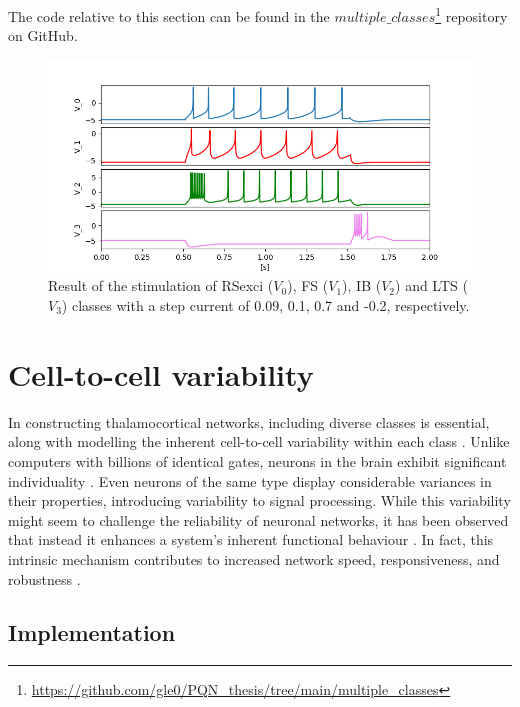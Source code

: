 The code relative to this section can be found in 
the $multiple\_classes$\footnote{\url{https://github.com/gle0/PQN_thesis/tree/main/multiple_classes}} repository on GitHub.\\

\begin{figure}[ht]
    \begin{center}
    \includegraphics[width=0.8\linewidth]{img/pqn4.PNG}
    \end{center}
    \caption[Simulation of multiple classes population]{Result of the stimulation of RSexci ($V_{0}$), FS ($V_{1}$), IB ($V_{2}$) and LTS ($V_{3}$) classes with a step current of 0.09, 0.1, 0.7 and -0.2, respectively.}
    \label{fig:pqn4}
\end{figure}

\clearpage

\section{Cell-to-cell variability}

In constructing thalamocortical networks, including diverse classes is essential, 
along with modelling the inherent cell-to-cell variability within each 
class \cite{Pospischil}. Unlike computers with billions of identical gates, 
neurons in the brain exhibit significant individuality \cite{Stein,Urban}. 
Even neurons of the same type display considerable variances in their properties, 
introducing variability to signal processing. While this variability might seem to 
challenge the reliability of neuronal networks, it has been observed that instead it 
enhances a system's inherent functional behaviour \cite{Balasubramanian,Perez-Nievez,Zendrikov}. 
In fact, this intrinsic mechanism contributes to increased network speed, 
responsiveness, and robustness \cite{Lengler}.\\

\subsection{Implementation}

